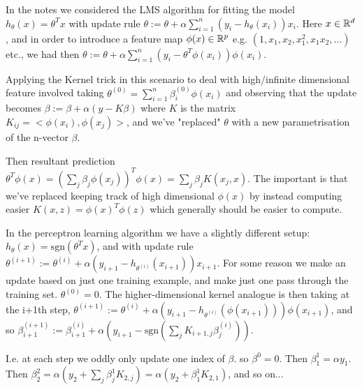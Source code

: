 %
%
\begin{answer}
In the notes we considered the LMS algorithm for fitting the model $h_\theta(x) = \theta^T x$ with update rule $\theta := \theta + \alpha \sum_{i=1}^n (y_i - h_\theta(x_i)) x_i$. Here $x \in \mathbb{R}^d$, and in order to introduce a feature map $\phi(x) \in \mathbb{R}^p$ e.g. $(1, x_1, x_2, x_1^2, x_1 x_2, ...)$ etc., we had then $\theta := \theta + \alpha \sum_{i=1}^n ( y_i - \theta^T \phi(x_i)) \phi (x_i)$.

\par
Applying the Kernel trick in this scenario to deal with high/infinite dimensional feature involved taking $\theta^{(0)} = \sum_{i=1}^n \beta_i^{(0)} \phi(x_i)$ and observing that the update becomes $\beta:= \beta + \alpha (y - K \beta)$ where $K$ is the matrix $K_{ij} = < \phi(x_i), \phi(x_j) >$, and we've "replaced" $\theta$ with a new parametrisation of the n-vector $\beta$.


Then resultant prediction $\theta^T \phi(x) = (\sum_j \beta_j \phi(x_j))^T \phi(x) = \sum_j \beta_j K(x_j, x)$. The important is that we've replaced keeping track of high dimensional $\phi(x)$ by instead computing easier $K(x,z) = \phi(x)^T \phi(z)$ which generally should be easier to compute.


In the perceptron learning algorithm we have a slightly different setup: $h_\theta(x) = \text{sgn}(\theta^T x)$, and with update rule $\theta^{(i+1)} := \theta^{(i)} + \alpha(y_{i+1} - h_{\theta^{(i)}}(x_{i+1})) x_{i+1}$. For some reason we make an update based on just one training example, and make just one pass through the training set. $\theta^{(0)} = 0$. The higher-dimensional kernel analogue is then taking at the i+1th step, $\theta^{(i+1)} := \theta^{(i)} + \alpha(y_{i+1} - h_{\theta^{(i)}}(\phi(x_{i+1}))) \phi(x_{i+1})$, and so $\beta^{(i+1)}_{i+1} := \beta^{(i)}_{i+1} + \alpha(y_{i+1} - \text{sgn}(\sum_j K_{i+1,j} \beta_j^{(i)}))$.


I.e. at each step we oddly only update one index of $\beta$. so $\beta^0 = 0$. Then $\beta^1_1 = \alpha y_1$. Then $\beta^2_2 = \alpha(y_2 + \sum_j \beta^1_j K_{2, j}) = \alpha(y_2 + \beta^1_1 K_{2,1})$, and so on...
 
\end{answer}
%